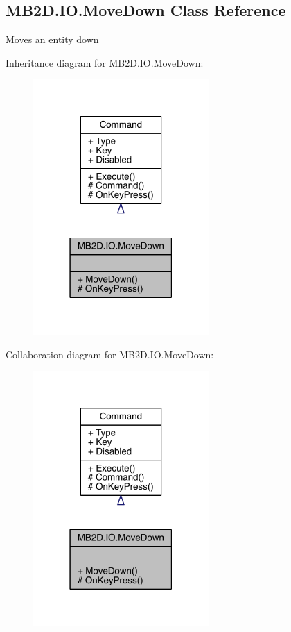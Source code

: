 \hypertarget{class_m_b2_d_1_1_i_o_1_1_move_down}{}\subsection{M\+B2\+D.\+I\+O.\+Move\+Down Class Reference}
\label{class_m_b2_d_1_1_i_o_1_1_move_down}


Moves an entity down  




Inheritance diagram for M\+B2\+D.\+I\+O.\+Move\+Down\+:
\nopagebreak
\begin{figure}[H]
\begin{center}
\leavevmode
\includegraphics[width=190pt]{class_m_b2_d_1_1_i_o_1_1_move_down__inherit__graph}
\end{center}
\end{figure}


Collaboration diagram for M\+B2\+D.\+I\+O.\+Move\+Down\+:
\nopagebreak
\begin{figure}[H]
\begin{center}
\leavevmode
\includegraphics[width=190pt]{class_m_b2_d_1_1_i_o_1_1_move_down__coll__graph}
\end{center}
\end{figure}
